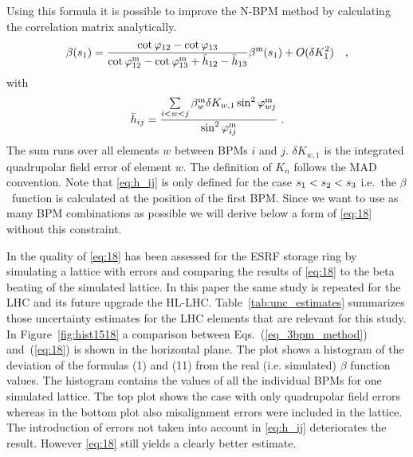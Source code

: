 Using this formula it is possible to improve the N-BPM method by calculating the correlation matrix
analytically.
%
\begin{equation}
\beta(s_1) = \frac{\cot\varphi_{12} - \cot\varphi_{13}}{\cot\varphi_{12}^\text{m} - \cot\varphi_{13}^\text{m} +\bar{h}_{12} - \bar{h}_{13}}\beta^\text{m}(s_1) + O(\delta K_1^2)\quad ,
\label{eq:18}
\end{equation}
%
with 
%
\begin{equation}
\bar{h}_{ij} =  \dfrac{\sum\limits_{i<w<j}\beta_w^\text{m}\delta K_{w,1}\sin^2\varphi_{wj}^\text{m}}{\sin^2\varphi_{ij}^\text{m}}\;.
\label{eq:h_ij}
\end{equation}
%
The sum runs over all elements $ w $ between BPMs $i$ and $j$. $\delta K_{w,1}$ is the integrated quadrupolar field error
of element $w$. The definition of $ K_n $ follows the MAD \cite{madx} convention.
Note that \eqref{eq:h_ij} is only defined for the case $ s_1 <\nobreak s_2 < s_3 $ i.e.~the
$ \beta $~function is calculated at the position of the first BPM. Since we want to use as many BPM
combinations as possible we will derive below a form of \eqref{eq:18} without this constraint.

In \cite{Franchi2016} the quality of \eqref{eq:18} has been assessed for the ESRF storage ring by
simulating a lattice with errors and comparing the results of \eqref{eq:18} to the beta beating of
the simulated lattice. In this paper the same study is repeated for the LHC and its future upgrade the HL-LHC.
Table~\ref{tab:unc_estimates} summarizes those uncertainty estimates for the LHC elements that are
relevant for this study. 
In Figure~\ref{fig:hist1518} a comparison between Eqs.~(\ref{eq_3bpm_method}) and~(\ref{eq:18}) is shown
in the horizontal plane. The plot shows a histogram of the deviation of the formulas (1) and (11)
from the real (i.e. simulated) $ \beta $ function values. The histogram contains the values of all the
individual BPMs for one simulated lattice. The top plot shows the case with only quadrupolar field
errors whereas in the bottom plot also misalignment errors were included in the lattice. The introduction
of errors not taken into account in \eqref{eq:h_ij} deteriorates the result. However \eqref{eq:18}
still yields a clearly better estimate.


